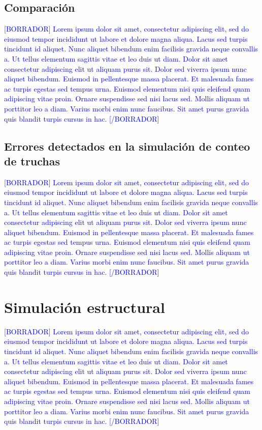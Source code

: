 \subsection{Comparación}

\textcolor{blue}{[BORRADOR] Lorem ipsum dolor sit amet, consectetur adipiscing elit, sed do eiusmod tempor incididunt ut labore et dolore magna aliqua. Lacus sed turpis tincidunt id aliquet. Nunc aliquet bibendum enim facilisis gravida neque convallis a. Ut tellus elementum sagittis vitae et leo duis ut diam. Dolor sit amet consectetur adipiscing elit ut aliquam purus sit. Dolor sed viverra ipsum nunc aliquet bibendum. Euismod in pellentesque massa placerat. Et malesuada fames ac turpis egestas sed tempus urna. Euismod elementum nisi quis eleifend quam adipiscing vitae proin. Ornare suspendisse sed nisi lacus sed. Mollis aliquam ut porttitor leo a diam. Varius morbi enim nunc faucibus. Sit amet purus gravida quis blandit turpis cursus in hac. [/BORRADOR]} 

\subsection{Errores detectados en la simulación de conteo de truchas}

\textcolor{blue}{[BORRADOR] Lorem ipsum dolor sit amet, consectetur adipiscing elit, sed do eiusmod tempor incididunt ut labore et dolore magna aliqua. Lacus sed turpis tincidunt id aliquet. Nunc aliquet bibendum enim facilisis gravida neque convallis a. Ut tellus elementum sagittis vitae et leo duis ut diam. Dolor sit amet consectetur adipiscing elit ut aliquam purus sit. Dolor sed viverra ipsum nunc aliquet bibendum. Euismod in pellentesque massa placerat. Et malesuada fames ac turpis egestas sed tempus urna. Euismod elementum nisi quis eleifend quam adipiscing vitae proin. Ornare suspendisse sed nisi lacus sed. Mollis aliquam ut porttitor leo a diam. Varius morbi enim nunc faucibus. Sit amet purus gravida quis blandit turpis cursus in hac. [/BORRADOR]} 

\section{Simulación estructural}

\textcolor{blue}{[BORRADOR] Lorem ipsum dolor sit amet, consectetur adipiscing elit, sed do eiusmod tempor incididunt ut labore et dolore magna aliqua. Lacus sed turpis tincidunt id aliquet. Nunc aliquet bibendum enim facilisis gravida neque convallis a. Ut tellus elementum sagittis vitae et leo duis ut diam. Dolor sit amet consectetur adipiscing elit ut aliquam purus sit. Dolor sed viverra ipsum nunc aliquet bibendum. Euismod in pellentesque massa placerat. Et malesuada fames ac turpis egestas sed tempus urna. Euismod elementum nisi quis eleifend quam adipiscing vitae proin. Ornare suspendisse sed nisi lacus sed. Mollis aliquam ut porttitor leo a diam. Varius morbi enim nunc faucibus. Sit amet purus gravida quis blandit turpis cursus in hac. [/BORRADOR]} 



